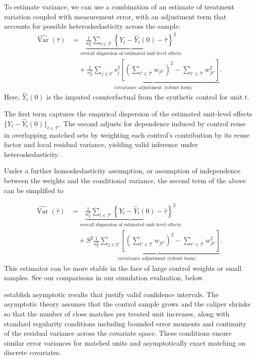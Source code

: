 \documentclass[11pt]{article}
\newcommand{\Tset}{\mathcal{T}}
\newcommand{\Cset}{\mathcal{C}}
\newcommand{\Var}{\operatorname{Var}}
\begin{document}
To estimate variance, we can use a combination of an estimate of treatment variation coupled with measurement error, with an adjustment term that accounts for possible heteroskedasticity across the sample:
\begin{align}
\label{eq:total-variance-estimator}
\widehat{\Var}(\hat{\tau})
&=
\underbrace{\frac{1}{n_T^2}\sum_{t\in\Tset}
\left\{Y_t-\hat{Y}_t(0)-\hat{\tau}\right\}^2}_{\text{overall dispersion of estimated unit-level effects}}
\nonumber\\
&\quad+
\underbrace{\frac{1}{n_T^2}\sum_{j\in\Cset} s_j^2
\left[
\left(\sum_{t'\in\Tset} w_{jt'}\right)^2
-
\sum_{t'\in\Tset} w_{jt'}^2
\right]}_{\text{covariance adjustment (robust form)}}.
\end{align}
Here, $\hat{Y}_t(0)$ is the imputed counterfactual from the synthetic control for unit $t$.

The first term captures the empirical dispersion of the estimated unit-level effects $\{Y_t-\hat{Y}_t(0)\}_{t\in\Tset}$.
The second adjusts for dependence induced by control reuse in overlapping matched sets by weighting each control's contribution by its reuse factor and local residual variance, yielding valid inference under heteroskedasticity.

Under a further homoskedasticity assumption, or assumption of independence between the weights and the conditional variance, the second term of the above can be simplified to 

\begin{align}
\label{eq:total-variance-estimator-homo}
\widehat{\Var}(\hat{\tau})
&=
\underbrace{\frac{1}{n_T^2}\sum_{t\in\Tset}
\left\{Y_t-\hat{Y}_t(0)-\hat{\tau}\right\}^2}_{\text{overall dispersion of estimated unit-level effects}}
\nonumber\\
&\quad+
S^2 \underbrace{\frac{1}{n_T^2}\sum_{j\in\Cset} 
\left[
\left(\sum_{t'\in\Tset} w_{jt'}\right)^2
-
\sum_{t'\in\Tset} w_{jt'}^2
\right]}_{\text{covariance adjustment (robust form)}}.
\end{align}
This estimator can be more stable in the face of large control weights or small samples.
See our comparisons in our simulation evaluation, below.


\citet{meng2025varianceestimationmatchingreweighting} establish asymptotic results that justify valid confidence intervals.
The asymptotic theory assumes that the control sample grows and the caliper shrinks so that the number of close matches per treated unit increases, along with standard regularity conditions including bounded error moments and continuity of the residual variance across the covariate space.
These conditions ensure similar error variances for matched units and asymptotically exact matching on discrete covariates.
\end{document}
